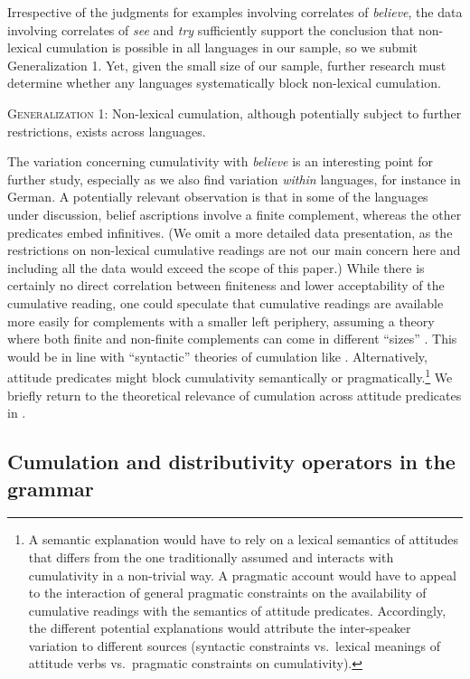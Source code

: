 \documentclass[output=paper]{langscibook}
\begin{document}
Irrespective of the judgments for examples involving correlates of \textit{believe}, the data involving correlates of \textit{see} and \textit{try} sufficiently support the conclusion that non-lexical cumulation is possible in all languages in our sample, so we submit Generalization 1. Yet, given the small size of our sample, further research must determine whether any languages systematically block non-lexical cumulation.

\ea \textsc{Generalization 1:} Non-lexical cumulation, although potentially subject to further restrictions, exists across languages. \z

\noindent The variation concerning cumulativity with \textit{believe} is an interesting point for further study, especially as we also find variation \textit{within} languages, for instance in German. A potentially relevant observation is that in some of the languages under discussion, belief ascriptions involve a finite complement, whereas the other predicates embed infinitives. (We omit a more detailed  data presentation, as the restrictions on non-lexical cumulative readings are not our main concern here and including all the data would exceed the scope of this paper.) While there is certainly no direct correlation between finiteness and lower acceptability of the cumulative reading, one could speculate that cumulative readings are available more easily for complements with a smaller left periphery, assuming a theory where both finite and non-finite complements can come in different ``sizes'' \citep{Wurmbrand:2015,Todorovic:2020}. This would be in line with ``syntactic'' theories of cumulation like \citet{Beck:2000a}. Alternatively, attitude predicates might block cumulativity semantically or pragmatically.\footnote{A semantic explanation would have to rely on a lexical semantics of attitudes that differs from the one traditionally assumed and interacts with cumulativity in a non-trivial way. A pragmatic account would have to appeal to the interaction of  general pragmatic constraints on the availability of cumulative readings with the semantics of attitude predicates. Accordingly, the different potential explanations would attribute the inter-speaker variation to different sources (syntactic constraints vs.~lexical meanings of attitude verbs vs.~pragmatic constraints on cumulativity).} We briefly return to the theoretical relevance of cumulation across attitude predicates in .

\subsection{Cumulation and distributivity operators in the grammar}\label{has-sch:sec:3.2}
\end{document}
